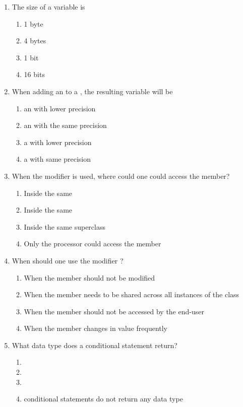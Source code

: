 \documentclass[11pt,fleqn]{article}
\begin{document}
\begin{enumerate}
\item The size of a  variable is
	\begin{enumerate}
	\item 1 byte
	\item 4 bytes
	\item 1 bit
	\item 16 bits
	\end{enumerate}
\item When adding an  to a , the resulting variable will be
	\begin{enumerate}
	\item an  with lower precision
	\item an  with the same precision
	\item a  with lower precision
	\item a  with same precision
	\end{enumerate}
\item When the modifier  is used, where could one could access the member?
	\begin{enumerate}
	\item Inside the same 
	\item Inside the same 
	\item Inside the same superclass
	\item Only the processor could access the member
	\end{enumerate}
\item When should one use the modifier ?
	\begin{enumerate}
	\item When the member should not be modified
	\item When the member needs to be shared across all instances of the class
	\item When the member should not be accessed by the end-user
	\item When the member changes in value frequently
	\end{enumerate}
\item What data type does a conditional statement return?
	\begin{enumerate}
	\item {}
	\item {}
	\item {}
	\item conditional statements do not return any data type

\end{enumerate}
\end{enumerate}
\end{document}
